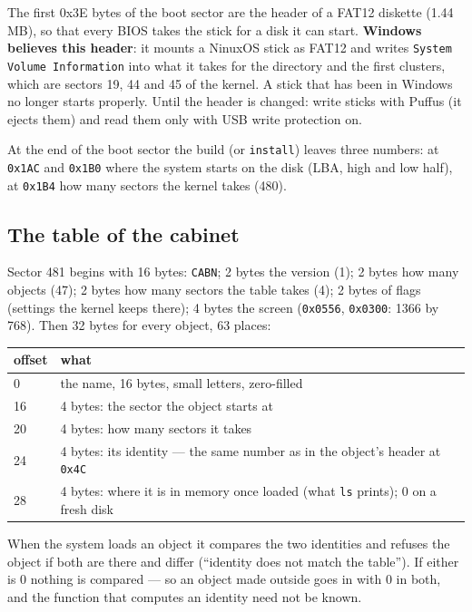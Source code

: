 \documentclass[11pt,a4paper]{article}
\newcommand{\file}[1]{\texttt{#1}}
\newcommand{\cmd}[1]{\texttt{#1}}
\begin{document}
\noindent The first 0x3E bytes of the boot sector are the header of a FAT12 diskette (1.44 MB),
so that every BIOS takes the stick for a disk it can start. \textbf{Windows believes this header}:
it mounts a NinuxOS stick as FAT12 and writes \file{System Volume Information} into what it takes
for the directory and the first clusters, which are sectors 19, 44 and 45 of the kernel. A stick
that has been in Windows no longer starts properly. Until the header is changed: write sticks with
Puffus (it ejects them) and read them only with USB write protection on.

At the end of the boot sector the build (or \cmd{install}) leaves three numbers: at \texttt{0x1AC}
and \texttt{0x1B0} where the system starts on the disk (LBA, high and low half), at \texttt{0x1B4}
how many sectors the kernel takes (480).

\subsection{The table of the cabinet}

Sector 481 begins with 16 bytes: \texttt{CABN}; 2 bytes the version (1); 2 bytes how many objects
(47); 2 bytes how many sectors the table takes (4); 2 bytes of flags (settings the kernel keeps
there); 4 bytes the screen (\texttt{0x0556}, \texttt{0x0300}: 1366 by 768). Then 32 bytes for every
object, 63 places:

\begin{longtable}{@{}l p{12cm}@{}}
\toprule
offset & what \\ \midrule
0 & the name, 16 bytes, small letters, zero-filled \\
16 & 4 bytes: the sector the object starts at \\
20 & 4 bytes: how many sectors it takes \\
24 & 4 bytes: its identity --- the same number as in the object's header at \texttt{0x4C} \\
28 & 4 bytes: where it is in memory once loaded (what \cmd{ls} prints); 0 on a fresh disk \\
\bottomrule
\end{longtable}

\noindent When the system loads an object it compares the two identities and refuses the object
if both are there and differ (``identity does not match the table''). If either is 0 nothing is
compared --- so an object made outside goes in with 0 in both, and the function that computes an
identity need not be known.
\end{document}
